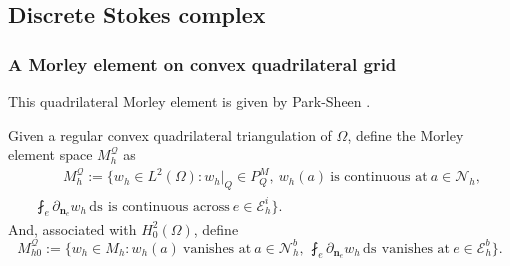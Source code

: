 \documentclass[12pt,showkeys]{amsart}
\begin{document}
\subsection{Discrete Stokes complex}

\subsubsection{A Morley element on convex quadrilateral grid}
This quadrilateral Morley element is given by Park-Sheen \cite{Park.C;Sheen.D2013}. \\

{\centering
{}}

Given a regular convex quadrilateral triangulation of $\Omega$, define the Morley element space $M_h^{\mathcal{Q}}$ as
\begin{multline*}
\qquad M_h^{\mathcal{Q}}:=\{w_h\in L^2(\Omega):w_h|_Q\in P_Q^M,\ w_h(a)\ \mbox{is\ continuous\ at}\ a\in\mathcal{N}_h,\  \\ 
\fint_e\partial_{\mathbf{n}_e}w_h{\,\mathrm{ds}\,}\ \mbox{is\ continuous\ across}\ e\in\mathcal{E}_h^i\}.\qquad
\end{multline*}
And, associated with $H^2_0(\Omega)$, define 
$$
M_{h0}^{\mathcal{Q}}:=\{w_h\in M_h:w_h(a)\ \mbox{vanishes\ at}\ a\in\mathcal{N}_h^b,\ \fint_e\partial_{\mathbf{n}_e}w_h{\,\mathrm{ds}\,}\ \mbox{vanishes\ at}\ e\in\mathcal{E}_h^b\}.
$$
\end{document}
